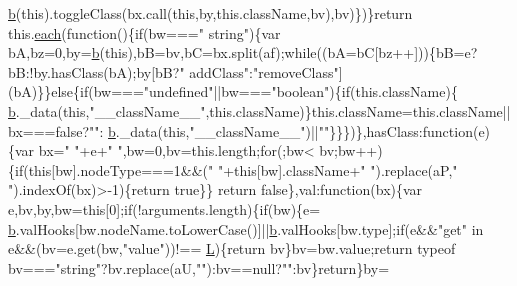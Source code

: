 \begin{DoxyCode}
      \hyperlink{jquery_8js_aa4026ad5544b958e54ce5e106fa1c805}{b}(\textcolor{keyword}{this}).toggleClass(bx.call(\textcolor{keyword}{this},by,\textcolor{keyword}{this}.className,bv),bv)\})\}\textcolor{keywordflow}{return} this.\hyperlink{jquery_8js_a871ff39db627c54c710a3e9909b8234c}{each}(\textcolor{keyword}{function}()\{\textcolor{keywordflow}{if}(bw===\textcolor{stringliteral}{"
      string"})\{var bA,bz=0,by=\hyperlink{jquery_8js_aa4026ad5544b958e54ce5e106fa1c805}{b}(\textcolor{keyword}{this}),bB=bv,bC=bx.split(af);\textcolor{keywordflow}{while}((bA=bC[bz++]))\{bB=e?bB:!by.hasClass(bA);by[bB?\textcolor{stringliteral}{"
      addClass"}:\textcolor{stringliteral}{"removeClass"}](bA)\}\}\textcolor{keywordflow}{else}\{\textcolor{keywordflow}{if}(bw===\textcolor{stringliteral}{"undefined"}||bw===\textcolor{stringliteral}{"boolean"})\{\textcolor{keywordflow}{if}(this.className)\{
      \hyperlink{jquery_8js_aa4026ad5544b958e54ce5e106fa1c805}{b}.\_data(\textcolor{keyword}{this},\textcolor{stringliteral}{"\_\_className\_\_"},this.className)\}this.className=this.className||bx===\textcolor{keyword}{false}?\textcolor{stringliteral}{""}:
      \hyperlink{jquery_8js_aa4026ad5544b958e54ce5e106fa1c805}{b}.\_data(\textcolor{keyword}{this},\textcolor{stringliteral}{"\_\_className\_\_"})||\textcolor{stringliteral}{""}\}\}\})\},hasClass:\textcolor{keyword}{function}(e)\{var bx=\textcolor{stringliteral}{" "}+e+\textcolor{stringliteral}{" "},bw=0,bv=this.length;\textcolor{keywordflow}{for}(;bw<
      bv;bw++)\{\textcolor{keywordflow}{if}(\textcolor{keyword}{this}[bw].nodeType===1&&(\textcolor{stringliteral}{" "}+\textcolor{keyword}{this}[bw].className+\textcolor{stringliteral}{" "}).replace(aP,\textcolor{stringliteral}{" "}).indexOf(bx)>-1)\{\textcolor{keywordflow}{return} \textcolor{keyword}{true}\}\}\textcolor{keywordflow}{
      return} \textcolor{keyword}{false}\},val:\textcolor{keyword}{function}(bx)\{var e,bv,by,bw=\textcolor{keyword}{this}[0];\textcolor{keywordflow}{if}(!arguments.length)\{\textcolor{keywordflow}{if}(bw)\{e=
      \hyperlink{jquery_8js_aa4026ad5544b958e54ce5e106fa1c805}{b}.valHooks[bw.nodeName.toLowerCase()]||\hyperlink{jquery_8js_aa4026ad5544b958e54ce5e106fa1c805}{b}.valHooks[bw.type];\textcolor{keywordflow}{if}(e&&\textcolor{stringliteral}{"get"} in e&&(bv=e.get(bw,\textcolor{stringliteral}{"value"}))!==
      \hyperlink{jquery_8js_a38ee4c0b5f4fe2a18d0c783af540d253}{L})\{\textcolor{keywordflow}{return} bv\}bv=bw.value;\textcolor{keywordflow}{return} typeof bv===\textcolor{stringliteral}{"string"}?bv.replace(aU,\textcolor{stringliteral}{""}):bv==null?\textcolor{stringliteral}{""}:bv\}\textcolor{keywordflow}{return}\}by=

\end{DoxyCode}
